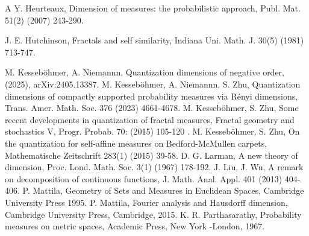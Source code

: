 \documentclass{amsproc}
\theoremstyle{definition}
\theoremstyle{remark}
\numberwithin{equation}{section}
\begin{document}
\begin{thebibliography}{A}
 Y. Heurteaux, Dimension of measures: the probabilistic approach, Publ. Mat. 51(2) (2007) 243-290.
 
 J. E. Hutchinson, Fractals and self similarity, Indiana Uni. Math. J. 30(5) (1981) 713-747.
 

  


 M. Kesseböhmer, A. Niemannn, Quantization dimensions of negative order, (2025), 	arXiv:2405.13387.
 M. Kesseböhmer, A. Niemannn, S. Zhu, 
Quantization dimensions of compactly supported probability measures via R\'enyi dimensions,
Trans. Amer. Math. Soc. 376 (2023) 4661-4678.
  M. Kesseböhmer, S. Zhu,
Some recent developments in quantization of fractal measures,
 Fractal geometry and stochastics V, Progr. Probab. 70: (2015) 105-120 .
 M. Kesseböhmer, S. Zhu,
On the quantization for self-affine measures on Bedford-McMullen carpets,
Mathematische Zeitschrift  283(1) (2015) 39-58.
 D. G. Larman, A new theory of dimension, Proc. Lond. Math. Soc. 3(1) (1967) 178-192.
 J. Liu, J. Wu,
     A remark on decomposition of continuous functions, J. Math. Anal. Appl. 401 (2013) 404-406.
       P. Mattila, Geometry of Sets and Measures in Euclidean Spaces, Cambridge University Press 1995.
      P. Mattila, Fourier analysis and Hausdorff dimension, Cambridge University Press, Cambridge, 2015.
       K. R. Parthasarathy, Probability measures on metric spaces, Academic
      Press, New York -London, 1967.
    

\end{thebibliography}
\end{document}
